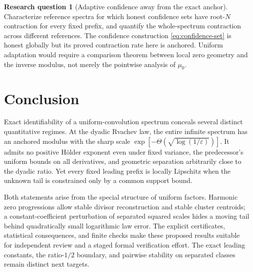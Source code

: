 \documentclass[11pt,a4paper]{article}
\numberwithin{equation}{section}
\theoremstyle{definition}
\newtheorem{question}{Research question}
\theoremstyle{remark}
\newcommand{\eps}{\varepsilon}
\begin{document}
\begin{question}[Adaptive confidence away from the exact anchor]
Characterize reference spectra for which honest confidence sets have
root-$N$ contraction for every fixed prefix, and quantify the whole-spectrum
contraction across different references. The confidence construction
\eqref{eq:confidence-set} is honest globally but its proved contraction rate
here is anchored. Uniform adaptation would require a comparison theorem
between local zero geometry and the inverse modulus, not merely the
pointwise analysis of $\mu_0$.
\end{question}

\section{Conclusion}

Exact identifiability of a uniform-convolution spectrum conceals several
distinct quantitative regimes. At the dyadic Rvachev law, the entire infinite
spectrum has an anchored modulus with the sharp scale
$\exp[-\Theta(\sqrt{\log(1/\eps)})]$. It admits no positive H\"older
exponent even under fixed variance, the predecessor's uniform bounds on all
derivatives, and geometric separation arbitrarily close to the dyadic ratio.
Yet every fixed leading prefix is locally Lipschitz when the unknown tail
is constrained only by a common support bound.

Both statements arise from the special structure of uniform factors. Harmonic
zero progressions allow stable divisor reconstruction and stable cluster
centroids; a constant-coefficient perturbation of separated squared scales
hides a moving tail behind quadratically small logarithmic law error.
The explicit certificates, statistical consequences, and finite checks make
these proposed results suitable for independent review and a staged formal
verification effort. The exact leading constants, the ratio-$1/2$ boundary,
and pairwise stability on separated classes remain distinct next targets.
\end{document}
